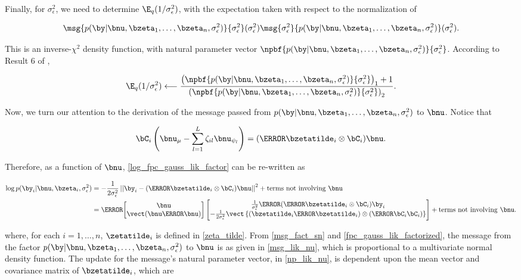 \documentclass[12pt]{article}
\def\sigsqeps{\sigma^2_{\epsilon}}
\def\numu{\bnu_\mu}
\newcommand\nupsi[1]{\bnu_{\psi_{#1}}}
\newcommand\tni[1]{\text{terms not involving $#1$}}
\theoremstyle{plain}
\theoremstyle{definition}
\theoremstyle{remark}
\begin{document}
\noindent Finally, for $\sigsqeps$, we need to determine $\E_q (1/\sigsqeps)$, with the expectation taken with
respect to the normalization of

\[
	\msg{p (\by | \bnu, \bzeta_1, \dots, \bzeta_n, \sigsqeps)}{\sigsqeps} (\sigsqeps)
	\msg{\sigsqeps}{p (\by | \bnu, \bzeta_1, \dots, \bzeta_n, \sigsqeps)} (\sigsqeps).
\]

\noindent This is an inverse-$\chi^2$ density function, with natural parameter vector $\npbf{p (\by | \bnu, \bzeta_1, \dots,
\bzeta_n, \sigsqeps)}{\sigsqeps}$. According to Result 6 of ,

\[
	\E_q (1/\sigsqeps)
		\longleftarrow
			\frac{
				\left( \npbf{p (\by | \bnu, \bzeta_1, \dots, \bzeta_n, \sigsqeps)}{\sigsqeps} \right)_1 + 1
			}{
				\left( \npbf{p (\by | \bnu, \bzeta_1, \dots, \bzeta_n, \sigsqeps)}{\sigsqeps} \right)_2
			}.
\]

Now, we turn our attention to the derivation of the message passed from $p (\by | \bnu, \bzeta_1, \dots, \bzeta_n,
\sigsqeps)$ to $\bnu$. Notice that

\begin{equation}
	\bC_i \left( \numu - \sum_{l=1}^L \zeta_{il} \nupsi{l} \right) = (\T{\bzetatilde_i} \otimes \bC_i) \bnu.
\label{theta_simplification}
\end{equation}

\noindent Therefore, as a function of $\bnu$, \eqref{log_fpc_gauss_lik_factor} can be re-written as

\begin{align*}
	\log p (\by_i | \bnu, \bzeta_i, \sigsqeps)
		& = -\frac{1}{2\sigsqeps} \left|\left|
			\by_i - (\T{\bzetatilde_i} \otimes \bC_i) \bnu
		\right|\right|^2 + \tni{\bnu} \\
		& = \T{\begin{bmatrix}
			\bnu \\
			\vect (\bnu \T{\bnu})
		\end{bmatrix}} \begin{bmatrix}
			\frac{1}{\sigsqeps} \T{(\T{\bzetatilde_i} \otimes \bC_i)} \by_i \\
			-\frac{1}{2\sigsqeps} \vect \left\{
				(\bzetatilde_i \T{\bzetatilde_i}) \otimes (\T{\bC_i} \bC_i)
			\right\}
		\end{bmatrix} + \tni{\bnu}.
\end{align*}

\noindent where, for each $i = 1, \dots, n$, $\zetatilde_i$ is defined in \eqref{zeta_tilde}.
From \eqref{msg_fact_sn} and \eqref{fpc_gauss_lik_factorized}, the message from the factor $p (\by | \bnu,
\bzeta_1, \dots, \bzeta_n, \sigsqeps)$ to $\bnu$ is as given in \eqref{msg_lik_nu}, which is proportional to a
multivariate normal density function. The update for the message's natural parameter vector,
in \eqref{np_lik_nu}, is dependent upon
the mean vector and covariance matrix of $\bzetatilde_i$, which are
\end{document}
